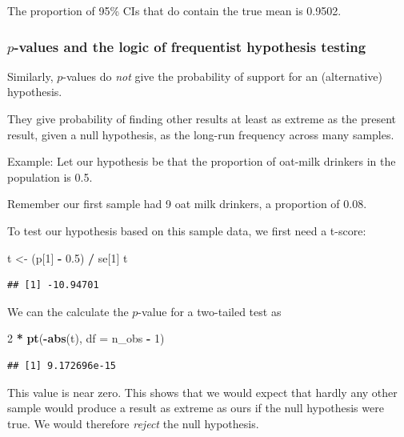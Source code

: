 \documentclass[
  11pt,
]{article}
\newenvironment{Shaded}{\begin{snugshade}}{\end{snugshade}}
\newcommand{\AttributeTok}[1]{\textcolor[rgb]{0.13,0.29,0.53}{#1}}
\newcommand{\DecValTok}[1]{\textcolor[rgb]{0.00,0.00,0.81}{#1}}
\newcommand{\FloatTok}[1]{\textcolor[rgb]{0.00,0.00,0.81}{#1}}
\newcommand{\FunctionTok}[1]{\textcolor[rgb]{0.13,0.29,0.53}{\textbf{#1}}}
\newcommand{\NormalTok}[1]{#1}
\newcommand{\OtherTok}[1]{\textcolor[rgb]{0.56,0.35,0.01}{#1}}
\newcommand{\SpecialCharTok}[1]{\textcolor[rgb]{0.81,0.36,0.00}{\textbf{#1}}}
\begin{document}
The proportion of 95\% CIs that do contain the true mean is 0.9502.

\hypertarget{p-values-and-the-logic-of-frequentist-hypothesis-testing}{%
\subsubsection{\texorpdfstring{\(p\)-values and the logic of frequentist hypothesis testing}{p-values and the logic of frequentist hypothesis testing}}\label{p-values-and-the-logic-of-frequentist-hypothesis-testing}}

Similarly, \(p\)-values do \emph{not} give the probability of support for an (alternative) hypothesis.

They give probability of finding other results at least as extreme as the present result, given a null hypothesis, as the long-run frequency across many samples.

Example: Let our hypothesis be that the proportion of oat-milk drinkers in the population is 0.5.

Remember our first sample had 9 oat milk drinkers, a proportion of 0.08.

To test our hypothesis based on this sample data, we first need a t-score:

\begin{Shaded}
\begin{Highlighting}[]
\NormalTok{t }\OtherTok{\textless{}{-}}\NormalTok{ (p[}\DecValTok{1}\NormalTok{] }\SpecialCharTok{{-}} \FloatTok{0.5}\NormalTok{) }\SpecialCharTok{/}\NormalTok{ se[}\DecValTok{1}\NormalTok{]}
\NormalTok{t}
\end{Highlighting}
\end{Shaded}

\begin{verbatim}
## [1] -10.94701
\end{verbatim}

We can the calculate the \(p\)-value for a two-tailed test as

\begin{Shaded}
\begin{Highlighting}[]
\DecValTok{2} \SpecialCharTok{*} \FunctionTok{pt}\NormalTok{(}\SpecialCharTok{{-}}\FunctionTok{abs}\NormalTok{(t), }\AttributeTok{df =}\NormalTok{ n\_obs }\SpecialCharTok{{-}} \DecValTok{1}\NormalTok{)}
\end{Highlighting}
\end{Shaded}

\begin{verbatim}
## [1] 9.172696e-15
\end{verbatim}

This value is near zero. This shows that we would expect that hardly any other sample would produce a result as extreme as ours if the null hypothesis were true. We would therefore \emph{reject} the null hypothesis.
\end{document}
